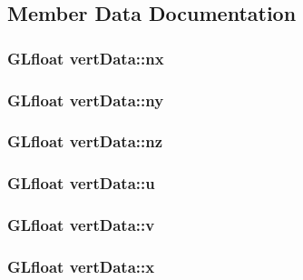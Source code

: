 \subsection{Member Data Documentation}
\hypertarget{structvertData_a87b6866bae90a9617864ca1e582f3ca7}{
\subsubsection[{nx}]{\setlength{\rightskip}{0pt plus 5cm}GLfloat {\bf vertData::nx}}}
\label{structvertData_a87b6866bae90a9617864ca1e582f3ca7}
\hypertarget{structvertData_a1804a6e90a3bc8db100fca75182b669b}{
\subsubsection[{ny}]{\setlength{\rightskip}{0pt plus 5cm}GLfloat {\bf vertData::ny}}}
\label{structvertData_a1804a6e90a3bc8db100fca75182b669b}
\hypertarget{structvertData_afe3e017da8c74b4ec972a7bff44be3d4}{
\subsubsection[{nz}]{\setlength{\rightskip}{0pt plus 5cm}GLfloat {\bf vertData::nz}}}
\label{structvertData_afe3e017da8c74b4ec972a7bff44be3d4}
\hypertarget{structvertData_ad1f8816dd0192f6879c4ee9bff6c700a}{
\subsubsection[{u}]{\setlength{\rightskip}{0pt plus 5cm}GLfloat {\bf vertData::u}}}
\label{structvertData_ad1f8816dd0192f6879c4ee9bff6c700a}
\hypertarget{structvertData_ad7a3ddf9fe3f9ff3c6aa7a0fe1b58ac7}{
\subsubsection[{v}]{\setlength{\rightskip}{0pt plus 5cm}GLfloat {\bf vertData::v}}}
\label{structvertData_ad7a3ddf9fe3f9ff3c6aa7a0fe1b58ac7}
\hypertarget{structvertData_a9f2687edf1fb3cf42ab1631b4d2fb088}{
\subsubsection[{x}]{\setlength{\rightskip}{0pt plus 5cm}GLfloat {\bf vertData::x}}}
